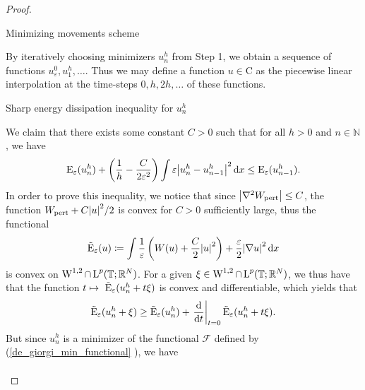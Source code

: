 \begin{proof}
\begin{description}[wide=0pt]
		\item[Step 2:] Minimizing movements scheme 
		
		By iteratively choosing minimizers $ u_{ n }^{ h } $ from Step 1, we obtain a sequence of functions $ u_{ \varepsilon }^{ 0 }, u_{ 1 }^{ h } , \dotsc $. Thus we may define a function $ u \in \mathrm{ C } $ as the piecewise linear interpolation at the time-steps $ 0, h , 2h, \dotsc $ of these functions.
		
		\item[Step 3:] Sharp energy dissipation inequality for $ u_{ n }^{ h } $
		
		We claim that there exists some constant $ C > 0 $ such that for all $ h > 0 $ and $ n \in \mathbb{ N } $, we have
		\begin{equation}
			\label{discrete_optimal_energy_dissipation}
			\operatorname{E}_{ \varepsilon } ( u_{ n }^{ h } )
			+
			\left( \frac{ 1 }{ h } - \frac{ C }{ 2 \varepsilon^{ 2 } } \right)
			\int \varepsilon \abs{ u_{ n }^{ h } - u_{ n - 1 }^{ h } }^{ 2 } \dd{ x }
			\leq
			\operatorname{E}_{ \varepsilon } ( u_{ n - 1 }^{ h } ).
		\end{equation}
		In order to prove this inequality, we notice that since $ \abs{ \nabla^{ 2 } W_{ \mathrm{pert} } } \leq C $, the function $ W_{ \mathrm{pert} } + C \abs{ u }^{ 2 }/2 $ is convex for $ C > 0 $ sufficiently large, thus the functional 
		\begin{equation*}
			\tilde{\operatorname{E}}_{ \varepsilon }  ( u )
			\coloneqq
			\int 
			\frac{ 1 }{ \varepsilon }
			\left( W ( u ) + \frac{ C }{ 2 } \abs{ u }^{ 2 } \right)
			+
			\frac{ \varepsilon}{ 2 }
			\abs{ \nabla u }^{ 2 }
			\dd{ x }
		\end{equation*}
		is convex on $ \operatorname{W}^{ 1 , 2 } \cap \operatorname{L}^{ p } ( \operatorname{\mathbb{T}} ; \mathbb{ R }^{ N } ) $. For a given $ \xi \in \operatorname{W}^{ 1 , 2 } \cap \operatorname{L}^{ p } ( \operatorname{\mathbb{T}} ; \mathbb{ R }^{ N } ) $, we thus have that the function
		$ t \mapsto \ \tilde{\operatorname{E}}_{ \varepsilon } ( u_{ n }^{ h } + t \xi ) $ is convex and differentiable, which yields that
		\begin{equation}
			\label{convexity_at_time_1}
			\tilde{\operatorname{E}}_{ \varepsilon } ( u_{ n }^{ h } + \xi )
			\geq
			\tilde{\operatorname{E}}_{ \varepsilon } ( u_{ n }^{ h } ) + 
			\left.\dv{ t }\right|_{ t = 0 } \tilde{\operatorname{E}}_{ \varepsilon } ( u_{ n }^{ h } + t \xi).
		\end{equation} 
		But since $ u_{ n }^{ h } $ is a minimizer of the functional $\mathcal{ F }$ defined by (\ref{de_giorgi_min_functional} ), we have
		\begin{align*}

\end{align*}
\end{description}
\end{proof}

